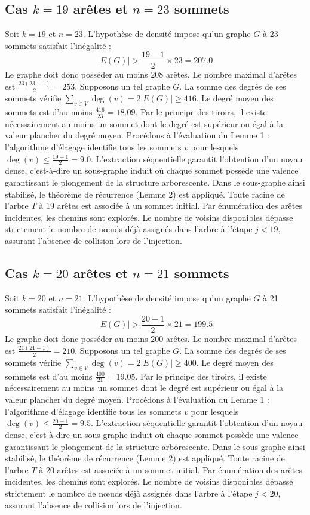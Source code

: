 \documentclass[12pt,a4paper]{article}
\begin{document}
\subsection{Cas $k = 19$ arêtes et $n = 23$ sommets}
Soit $k = 19$ et $n = 23$. L'hypothèse de densité impose qu'un graphe $G$ à 23 sommets satisfait l'inégalité :
$$ |E(G)| > \frac{19-1}{2} \times 23 = 207.0 $$
Le graphe doit donc posséder au moins $208$ arêtes. Le nombre maximal d'arêtes est $\frac{23(23-1)}{2} = 253$.
Supposons un tel graphe $G$. La somme des degrés de ses sommets vérifie $\sum_{v \in V} \deg(v) = 2|E(G)| \geq 416$.
Le degré moyen des sommets est d'au moins $\frac{416}{23} = 18.09$.
Par le principe des tiroirs, il existe nécessairement au moins un sommet dont le degré est supérieur ou égal à la valeur plancher du degré moyen.
Procédons à l'évaluation du Lemme 1 : l'algorithme d'élagage identifie tous les sommets $v$ pour lesquels $\deg(v) \leq \frac{19-1}{2} = 9.0$.
L'extraction séquentielle garantit l'obtention d'un noyau dense, c'est-à-dire un sous-graphe induit où chaque sommet possède une valence garantissant le plongement de la structure arborescente.
Dans le sous-graphe ainsi stabilisé, le théorème de récurrence (Lemme 2) est appliqué. Toute racine de l'arbre $T$ à 19 arêtes est associée à un sommet initial. Par énumération des arêtes incidentes, les chemins sont explorés. Le nombre de voisins disponibles dépasse strictement le nombre de nœuds déjà assignés dans l'arbre à l'étape $j < 19$, assurant l'absence de collision lors de l'injection.

\subsection{Cas $k = 20$ arêtes et $n = 21$ sommets}
Soit $k = 20$ et $n = 21$. L'hypothèse de densité impose qu'un graphe $G$ à 21 sommets satisfait l'inégalité :
$$ |E(G)| > \frac{20-1}{2} \times 21 = 199.5 $$
Le graphe doit donc posséder au moins $200$ arêtes. Le nombre maximal d'arêtes est $\frac{21(21-1)}{2} = 210$.
Supposons un tel graphe $G$. La somme des degrés de ses sommets vérifie $\sum_{v \in V} \deg(v) = 2|E(G)| \geq 400$.
Le degré moyen des sommets est d'au moins $\frac{400}{21} = 19.05$.
Par le principe des tiroirs, il existe nécessairement au moins un sommet dont le degré est supérieur ou égal à la valeur plancher du degré moyen.
Procédons à l'évaluation du Lemme 1 : l'algorithme d'élagage identifie tous les sommets $v$ pour lesquels $\deg(v) \leq \frac{20-1}{2} = 9.5$.
L'extraction séquentielle garantit l'obtention d'un noyau dense, c'est-à-dire un sous-graphe induit où chaque sommet possède une valence garantissant le plongement de la structure arborescente.
Dans le sous-graphe ainsi stabilisé, le théorème de récurrence (Lemme 2) est appliqué. Toute racine de l'arbre $T$ à 20 arêtes est associée à un sommet initial. Par énumération des arêtes incidentes, les chemins sont explorés. Le nombre de voisins disponibles dépasse strictement le nombre de nœuds déjà assignés dans l'arbre à l'étape $j < 20$, assurant l'absence de collision lors de l'injection.
\end{document}
